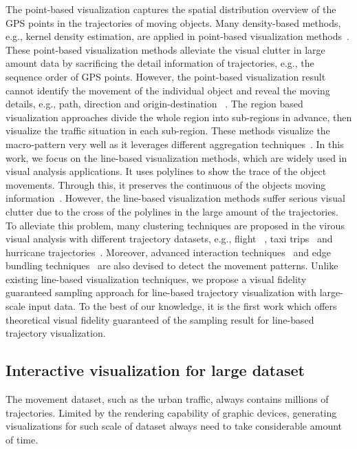 The point-based visualization captures the spatial distribution overview of the GPS points in the trajectories of moving objects.
Many density-based methods, e.g., kernel density estimation, are applied in point-based visualization methods~\cite{liu2013vait,yang2016exploring,chae2014public,xie2008kernel, borruso2008network}.
These point-based visualization methods alleviate the visual clutter in large amount data by sacrificing the detail information of trajectories, e.g., the sequence order of GPS points. 
However, the point-based visualization result cannot identify the movement of the individual object and reveal the moving details, e.g., path, direction and origin-destination ~\cite{chen2015survey}.
The region based visualization approaches divide the whole region into sub-regions in advance,
then visualize the traffic situation in each sub-region. 
These methods visualize the macro-pattern very well as it leverages different aggregation techniques~\cite{guo2009flow,wood2010visualisation,von2015mobilitygraphs}.
In this work, we focus on the line-based visualization methods, which are widely used in visual analysis applications.
It uses polylines to show the trace of the object movements.
Through this, it preserves the continuous of the objects moving information~\cite{guo2011tripvista,hurter2009fromdady}.
However, the line-based visualization methods suffer serious visual clutter due to the cross of the polylines in the large amount of the trajectories.
To alleviate this problem, many clustering techniques are proposed in the virous visual analysis with different trajectory datasets, e.g., flight ~\cite{ferreira2013vector}, taxi trips~\cite{rinzivillo2008visually} and hurricane trajectories~\cite{andrienko2017clustering}.
Moreover, advanced interaction techniques~\cite{kruger2013trajectorylenses, ferreira2013visual} and edge bundling techniques~\cite{zeng2019route} are also devised to detect the movement patterns.
Unlike existing line-based visualization techniques, we propose a visual fidelity  guaranteed sampling approach for line-based trajectory visualization with large-scale input data.
To the best of our knowledge, it is the first work which offers theoretical visual fidelity guaranteed of the sampling result for line-based trajectory visualization. 





\subsection{Interactive visualization for large dataset}\label{sec:interactive}
The movement dataset, such as the urban traffic, always contains millions of trajectories. Limited by the rendering capability of graphic devices, generating visualizations for such scale of dataset always need to take considerable amount of time.

